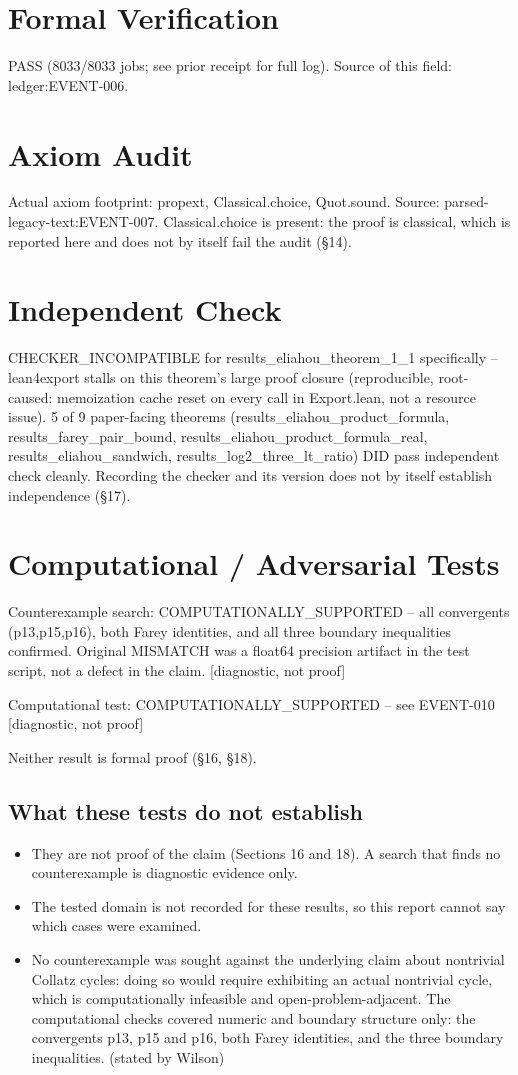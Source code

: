 \documentclass[11pt]{article}
\begin{document}
\section{Formal Verification}
PASS (8033/8033 jobs; see prior receipt for full log).
Source of this field: ledger:EVENT-006.
\section{Axiom Audit}
Actual axiom footprint: propext, Classical.choice, Quot.sound.
Source: parsed-legacy-text:EVENT-007.
Classical.choice is present: the proof is classical, which is reported here and does not by itself fail the audit (\S{}14).
\section{Independent Check}
CHECKER\_INCOMPATIBLE for results\_eliahou\_theorem\_1\_1 specifically -- lean4export stalls on this theorem's large proof closure (reproducible, root-caused: memoization cache reset on every call in Export.lean, not a resource issue). 5 of 9 paper-facing theorems (results\_eliahou\_product\_formula, results\_farey\_pair\_bound, results\_eliahou\_product\_formula\_real, results\_eliahou\_sandwich, results\_log2\_three\_lt\_ratio) DID pass independent check cleanly.
Recording the checker and its version does not by itself establish independence (\S{}17).
\section{Computational / Adversarial Tests}
Counterexample search: COMPUTATIONALLY\_SUPPORTED -- all convergents (p13,p15,p16), both Farey identities, and all three boundary inequalities confirmed. Original MISMATCH was a float64 precision artifact in the test script, not a defect in the claim. [diagnostic, not proof]

Computational test: COMPUTATIONALLY\_SUPPORTED -- see EVENT-010 [diagnostic, not proof]

Neither result is formal proof (\S{}16, \S{}18).
\subsection*{What these tests do not establish}
\begin{itemize}
\item They are not proof of the claim (Sections 16 and 18). A search that finds no counterexample is diagnostic evidence only.
\item The tested domain is not recorded for these results, so this report cannot say which cases were examined.
\item No counterexample was sought against the underlying claim about nontrivial Collatz cycles: doing so would require exhibiting an actual nontrivial cycle, which is computationally infeasible and open-problem-adjacent. The computational checks covered numeric and boundary structure only: the convergents p13, p15 and p16, both Farey identities, and the three boundary inequalities. (stated by Wilson)
\end{itemize}
\end{document}
